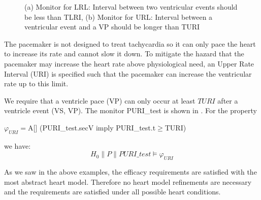 \begin{figure}[b]
\centering
	\caption{(a) Monitor for LRL: Interval between two ventricular events should be less than TLRI, (b) Monitor for URL: Interval between a ventricular event and a VP should be longer than TURI}
\end{figure} 

The pacemaker is not designed to treat tachycardia so it can only pace the heart to increase its rate and cannot slow it down. To mitigate the hazard that the pacemaker may increase the heart rate above physiological need, an Upper Rate Interval (URI) is specified such that the pacemaker can increase the ventricular rate up to this limit. 
  
We require that a ventricle pace (VP) can only occur at least $TURI$ after a ventricle event (VS, VP). The monitor \textsf{PURI\_test} is shown in . For the property
\begin{center}
$\varphi_{URI}=$\textsf{A[] (PURI\_test.secV imply PURI\_test.t$\geq$TURI)}
\end{center}
we have: $$H_0\| P\| PURI\_test\models \varphi_{URI}$$

As we saw in the above examples, the efficacy requirements are satisfied with the most abstract heart model.
Therefore no heart model refinements are necessary and the requirements are satisfied under all possible heart conditions.

